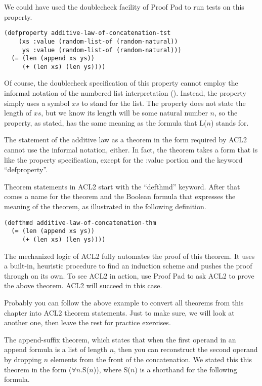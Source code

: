 We could have used the doublecheck facility of Proof Pad to run tests on this property.

\begin{Verbatim}
(defproperty additive-law-of-concatenation-tst
    (xs :value (random-list-of (random-natural))
     ys :value (random-list-of (random-natural)))
  (= (len (append xs ys))
     (+ (len xs) (len ys))))
\end{Verbatim}

Of course, the doublecheck specification of this property
cannot employ the informal notation of the numbered list interpretation
(\pageref{numbered-list-interpretation}).
Instead, the property simply uses a symbol $xs$ to stand for the list.
The property does not state the length of $xs$, but we know
its length will be some natural number $n$, so the property, as stated,
has the same meaning as the formula that L($n$) stands for.

The statement of the additive law as a theorem in the form
required by ACL2 cannot use the informal notation, either.
In fact, the theorem takes a form that is like the property specification,
except for the :value portion and the keyword ``defproperty''.

Theorem statements in ACL2 start with the ``defthmd'' keyword.
After that comes a name for the theorem and the Boolean formula
that expresses the meaning of the theorem, as illustrated in the following definition.

\begin{Verbatim}
(defthmd additive-law-of-concatenation-thm
  (= (len (append xs ys))
     (+ (len xs) (len ys))))
\end{Verbatim}

The mechanized logic of ACL2 fully automates the proof of this theorem.
It uses a built-in, heuristic procedure to find an induction scheme
and pushes the proof through on its own.
To see ACL2 in action, use Proof Pad to ask ACL2
to prove the above theorem. ACL2 will succeed in this case.

Probably you can follow the above example to convert all theorems
from this chapter into ACL2 theorem statements.
Just to make sure, we will look at another one,
then leave the rest for practice exercises.

The append-suffix theorem, which states that
when the first operand in an append formula is a list of length $n$,
then you can reconstruct the second operand by dropping $n$ elements
from the front of the concatenation.
We stated this this theorem in the form ($\forall$$n$.S($n$)),
where S($n$) is a shorthand for the following formula.


